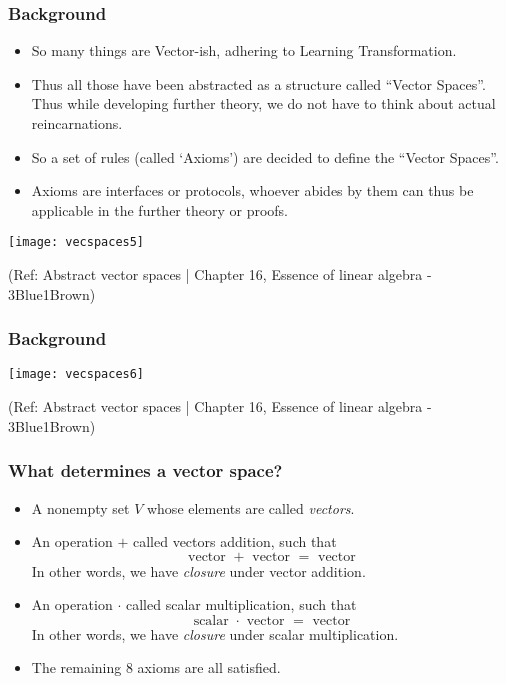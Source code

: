 \begin{frame}[fragile]
\frametitle{Background}

\begin{itemize}
\item So many things are Vector-ish, adhering to Learning Transformation.
\item Thus all those have been abstracted as a structure called ``Vector Spaces''. Thus while developing further theory, we do not have to think about actual reincarnations.
\item So a set of rules (called `Axioms') are decided to define the ``Vector Spaces''.
\item Axioms are interfaces or protocols, whoever abides by them can thus be applicable in the further theory or proofs.
\end{itemize}

\begin{center}
\texttt{[image: vecspaces5]}
\end{center}

\tiny{(Ref: Abstract vector spaces | Chapter 16, Essence of linear algebra - 3Blue1Brown)}

\end{frame}

\begin{frame}[fragile]
\frametitle{Background}

\begin{center}
\texttt{[image: vecspaces6]}
\end{center}

\tiny{(Ref: Abstract vector spaces | Chapter 16, Essence of linear algebra - 3Blue1Brown)}

\end{frame}




\begin{frame}[fragile]
\frametitle{What determines a vector space?}

\begin{itemize}
\item A nonempty set $V$ whose elements are called {\em vectors}.
\item An operation $+$ called vectors addition, such that $$ \text{ vector } + \text{ vector } = \text{ vector }$$ 
In other words, we have {\em closure} under vector addition.
\item An operation $\cdot$ called scalar multiplication, such that $$ \text{ scalar } \cdot \text{ vector } = \text{ vector }$$ 
In other words, we have {\em closure} under scalar multiplication.
\item The remaining 8 axioms are all satisfied. 
\end{itemize}
\end{frame}

